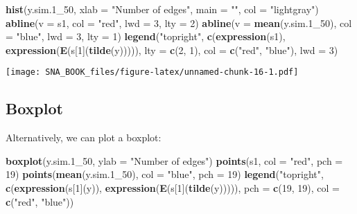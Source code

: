 \documentclass[]{book}
\newenvironment{Shaded}{\begin{snugshade}}{\end{snugshade}}
\newcommand{\KeywordTok}[1]{\textcolor[rgb]{0.13,0.29,0.53}{\textbf{{#1}}}}
\newcommand{\DataTypeTok}[1]{\textcolor[rgb]{0.13,0.29,0.53}{{#1}}}
\newcommand{\DecValTok}[1]{\textcolor[rgb]{0.00,0.00,0.81}{{#1}}}
\newcommand{\StringTok}[1]{\textcolor[rgb]{0.31,0.60,0.02}{{#1}}}
\newcommand{\NormalTok}[1]{{#1}}
\begin{document}
\begin{Shaded}
\begin{Highlighting}[]
\KeywordTok{hist}\NormalTok{(y.sim.1_50, }\DataTypeTok{xlab =} \StringTok{"Number of edges"}\NormalTok{, }\DataTypeTok{main =} \StringTok{""}\NormalTok{, }\DataTypeTok{col =} \StringTok{"lightgray"}\NormalTok{)}
\KeywordTok{abline}\NormalTok{(}\DataTypeTok{v =} \NormalTok{s1, }\DataTypeTok{col =} \StringTok{"red"}\NormalTok{, }\DataTypeTok{lwd =} \DecValTok{3}\NormalTok{, }\DataTypeTok{lty =} \DecValTok{2}\NormalTok{)}
\KeywordTok{abline}\NormalTok{(}\DataTypeTok{v =} \KeywordTok{mean}\NormalTok{(y.sim.1_50), }\DataTypeTok{col =} \StringTok{"blue"}\NormalTok{, }\DataTypeTok{lwd =} \DecValTok{3}\NormalTok{, }\DataTypeTok{lty =} \DecValTok{1}\NormalTok{)}
\KeywordTok{legend}\NormalTok{(}\StringTok{"topright"}\NormalTok{, }
       \KeywordTok{c}\NormalTok{(}\KeywordTok{expression}\NormalTok{(s1), }\KeywordTok{expression}\NormalTok{(}\KeywordTok{E}\NormalTok{(s[}\DecValTok{1}\NormalTok{](}\KeywordTok{tilde}\NormalTok{(y))))), }
       \DataTypeTok{lty =} \KeywordTok{c}\NormalTok{(}\DecValTok{2}\NormalTok{, }\DecValTok{1}\NormalTok{), }
       \DataTypeTok{col =} \KeywordTok{c}\NormalTok{(}\StringTok{"red"}\NormalTok{, }\StringTok{"blue"}\NormalTok{), }\DataTypeTok{lwd =} \DecValTok{3}\NormalTok{)}
\end{Highlighting}
\end{Shaded}

\texttt{[image: SNA\_BOOK\_files/figure-latex/unnamed-chunk-16-1.pdf]}

\subsection{Boxplot}\label{boxplot}

Alternatively, we can plot a boxplot:

\begin{Shaded}
\begin{Highlighting}[]
\KeywordTok{boxplot}\NormalTok{(y.sim.1_50, }\DataTypeTok{ylab =} \StringTok{"Number of edges"}\NormalTok{)}
\KeywordTok{points}\NormalTok{(s1, }\DataTypeTok{col =} \StringTok{"red"}\NormalTok{, }\DataTypeTok{pch =} \DecValTok{19}\NormalTok{)}
\KeywordTok{points}\NormalTok{(}\KeywordTok{mean}\NormalTok{(y.sim.1_50), }\DataTypeTok{col =} \StringTok{"blue"}\NormalTok{, }\DataTypeTok{pch =} \DecValTok{19}\NormalTok{)}
\KeywordTok{legend}\NormalTok{(}\StringTok{"topright"}\NormalTok{, }
       \KeywordTok{c}\NormalTok{(}\KeywordTok{expression}\NormalTok{(s[}\DecValTok{1}\NormalTok{](y)), }\KeywordTok{expression}\NormalTok{(}\KeywordTok{E}\NormalTok{(s[}\DecValTok{1}\NormalTok{](}\KeywordTok{tilde}\NormalTok{(y))))),}
       \DataTypeTok{pch =} \KeywordTok{c}\NormalTok{(}\DecValTok{19}\NormalTok{, }\DecValTok{19}\NormalTok{), }
       \DataTypeTok{col =} \KeywordTok{c}\NormalTok{(}\StringTok{"red"}\NormalTok{, }\StringTok{"blue"}\NormalTok{))}
\end{Highlighting}
\end{Shaded}
\end{document}
